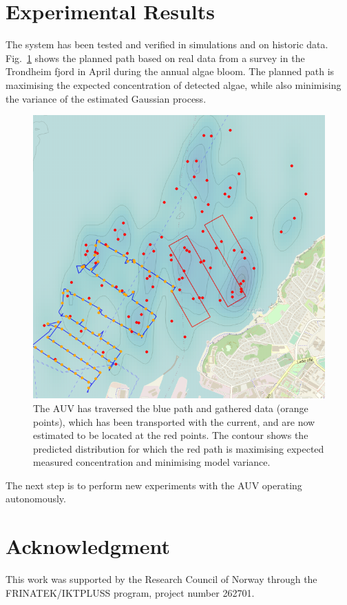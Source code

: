 \documentclass[conference]{IEEEtran}
\begin{document}
\section{Experimental Results}
The system has been tested and verified in simulations and on historic data. Fig.~\ref{fig:munkholmen} shows the planned path based on real data from a survey in the Trondheim fjord in April during the annual algae bloom. The planned path is maximising the expected concentration of detected algae, while also minimising the variance of the estimated Gaussian process.
\begin{figure}[tbp]
\centerline{\includegraphics[width=\linewidth]{figures/munkholmen_planned_path.png}}
\caption{The AUV has traversed the blue path and gathered data (orange points), which has been transported with the current, and are now estimated to be located at the red points.
The contour shows the predicted distribution for which the red path is maximising expected measured concentration and minimising model variance.}
\label{fig:munkholmen}
\end{figure}

The next step is to perform new experiments with the AUV operating autonomously.
\section*{Acknowledgment}
This work was supported by the Research Council of Norway through the FRINATEK/IKTPLUSS program, project number 262701.
\end{document}
